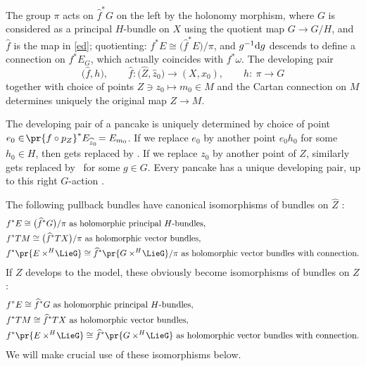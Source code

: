 \documentclass[10pt,a4paper]{amsart}
\numberwithin{equation}{section}
\newcommand{\amal}[3]{\ensuremath{{#1} \mathbin{\times^{#2}} \! #3}}
\begin{document}
The group $\pi$ acts on $\widehat{f}^* G$ on the left by the holonomy morphism,
where $G$ is considered as a principal $H$-bundle on $X$ using the quotient map
$G \longrightarrow G/H$, and $\widehat{f}$ is the map in \eqref{ed}; quotienting: $f^*E \cong \big(\widehat{f}^*E\big)/\pi$, and $g^{-1} {\rm d}g$ descends to define a connection on $f^*E_G$, which actually coincides with $f^*\omega$. The developing pair
\[
\big(\widehat{f}, h\big), \qquad
\widehat{f} \colon \big(\widehat{Z}, \widehat{z}_0\big) \to (X, x_0),\qquad
h \colon\ \pi \to G
\]
together with choice of points $Z \ni z_0 \longmapsto m_0 \in M$ and the Cartan connection on $M$ determines uniquely
the original map $Z \to M$.

The developing pair of a pancake is uniquely determined by choice of point $e_0 \in \! \pr{f \circ p_Z} ^* E_{\widehat{z}_0}
 \!= E_{m_0}$. If we replace $e_0$ by another point $e_0 h_0$ for some $h_0 \in H$, then
 gets replaced by .
If we replace $z_0$ by another point of $Z$, similarly  gets replaced by~ for some $g \in G$.
Every pancake has a unique developing pair, up to this right $G$-action \cite[Section~2.3]{Biswas.McKay:2016}.

The following pullback bundles have canonical isomorphisms of bundles on $\hat{Z}$ \cite[Section~2.3]{Biswas.McKay:2016}:
\begin{gather*}
\begin{split}
&f^* E \cong \big(\widehat{f}^* G\big)/\pi \text{ as holomorphic principal $H$-bundles}, \\
&f^* TM \cong \big(\widehat{f}^* TX\big)/\pi \text{ as holomorphic vector bundles}, \\
&f^* \pr{\amal{E}{H}{\LieG}} \cong \widehat{f}^* \pr{\amal{G}{H}{\LieG}}/\pi \text{ as holomorphic vector bundles with connection}.
\end{split}
\end{gather*}
If $Z$ develops to the model, these obviously become isomorphisms of bundles on $Z$:
\begin{gather*}
\begin{split}
&f^* E \cong \widehat{f}^* G \text{ as holomorphic principal $H$-bundles}, \\
&f^* TM \cong \widehat{f}^* TX \text{ as holomorphic vector bundles}, \\
&f^* \pr{\amal{E}{H}{\LieG}} \cong \widehat{f}^* \pr{\amal{G}{H}{\LieG}} \text{ as holomorphic vector bundles with connection}.
\end{split}
\end{gather*}
We will make crucial use of these isomorphisms below.
\end{document}
